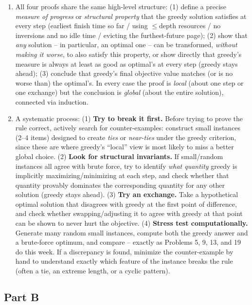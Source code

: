 \documentclass[11pt]{article}
\begin{document}
\begin{enumerate}[label=\textbf{A\arabic*.}, leftmargin=2.2em]
\item All four proofs share the same high-level structure: (1) define a precise
\emph{measure of progress} or \emph{structural property} that the greedy solution
satisfies at every step (earliest finish time so far / using $\le \mathrm{depth}$
resources / no inversions and no idle time / evicting the furthest-future page); (2) show
that \emph{any} solution -- in particular, an optimal one -- can be transformed,
\emph{without making it worse}, to also satisfy this property, or show directly that
greedy's measure is always at least as good as optimal's at every step (greedy stays
ahead); (3) conclude that greedy's final objective value matches (or is no worse than) the
optimal's. In every case the proof is \emph{local} (about one step or one exchange) but
the conclusion is \emph{global} (about the entire solution), connected via induction.

\item A systematic process: (1) \textbf{Try to break it first.} Before trying to prove the
rule correct, actively search for counter-examples: construct small instances (2--4
items) designed to create \emph{ties} or \emph{near-ties} under the greedy criterion,
since these are where greedy's ``local'' view is most likely to miss a better global
choice. (2) \textbf{Look for structural invariants.} If small/random instances all agree
with brute force, try to identify \emph{what quantity} greedy is implicitly
maximizing/minimizing at each step, and check whether that quantity provably dominates the
corresponding quantity for any other solution (greedy stays ahead). (3) \textbf{Try an
exchange.} Take a hypothetical optimal solution that disagrees with greedy at the first
point of difference, and check whether swapping/adjusting it to agree with greedy at that
point can be shown to never hurt the objective. (4) \textbf{Stress test computationally.}
Generate many random small instances, compute both the greedy answer and a brute-force
optimum, and compare -- exactly as Problems 5, 9, 13, and 19 do this week. If a
discrepancy is found, minimize the counter-example by hand to understand exactly which
feature of the instance breaks the rule (often a tie, an extreme length, or a cyclic
pattern).

\end{enumerate}

\subsection*{Part B}
\end{document}
